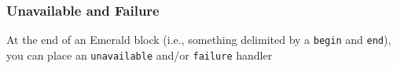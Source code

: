 \begin{frame}

\frametitle{Unavailable and Failure}

\begin{center}

At the end of an Emerald block (i.e., something delimited by a
\lstinline{begin} and \lstinline{end}), you can place an
\lstinline{unavailable} and/or \lstinline{failure} handler

\end{center}

\end{frame}
